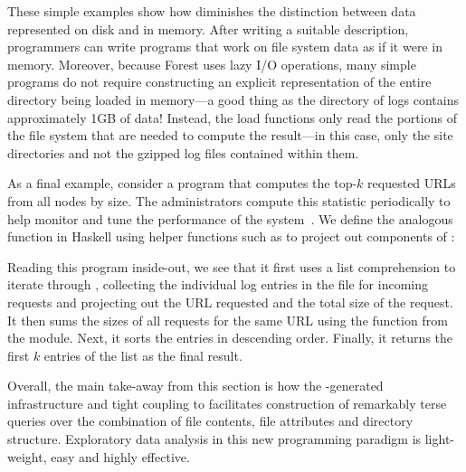 These simple examples show how \forest{} diminishes the distinction
between data represented on disk and in memory. After writing a
suitable \forest{} description, programmers can write programs that
work on file system data as if it were in memory. Moreover, because
Forest uses lazy I/O operations, many simple programs do not require
constructing an explicit representation of the entire directory being
loaded in memory---a good thing as the directory of \coral{} logs
contains approximately 1GB of data!  Instead, the load functions only
read the portions of the file system that are needed to compute the
result---in this case, only the site directories and not the gzipped
log files contained within them.

As a final example, consider a program that computes the top-$k$
requested URLs from all \coral{} nodes by size. The \coral{}
administrators compute this statistic periodically to help monitor and
tune the performance of the system~\cite{freedman:coral-experience}. 
We define the analogous function in Haskell using helper
functions such as  to project out components of
:
%
Reading this program inside-out, we see that it first uses a list
comprehension to iterate through , collecting the
individual log entries in the  file for
incoming requests and projecting out the URL requested and the total
size of the request. It then sums the sizes of all requests for the
same URL using the  function from the 
module. Next, it sorts the entries in descending order. Finally, it
returns the first $k$ entries of the list as the final result.

Overall, the main take-away from this section is how 
the \forest{}-generated infrastructure and tight coupling
to \haskell{} facilitates construction
of remarkably terse queries over the combination of file contents,
file attributes and directory structure.  Exploratory data analysis
in this new programming paradigm is light-weight, easy and highly effective.
